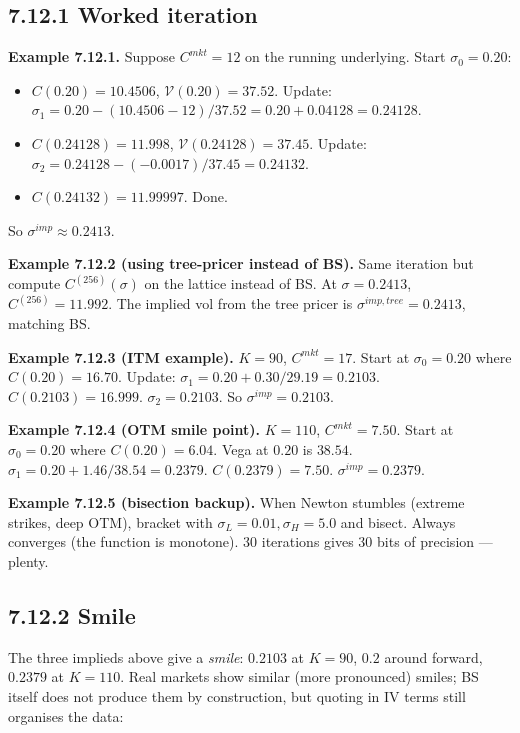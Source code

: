 \documentclass[
  10pt,
  twoside]{book}
\providecommand{\tightlist}{%
  \setlength{\itemsep}{0pt}\setlength{\parskip}{0pt}}
\begin{document}
\subsection{7.12.1 Worked iteration}\label{worked-iteration}

\textbf{Example 7.12.1.} Suppose \(C^{mkt} = 12\) on the running
underlying. Start \(\sigma_0 = 0.20\):

\begin{itemize}
\tightlist
\item
  \(C(0.20) = 10.4506\), \(\mathcal V(0.20) = 37.52\). Update:
  \(\sigma_1 = 0.20 - (10.4506 - 12)/37.52 = 0.20 + 0.04128 = 0.24128\).
\item
  \(C(0.24128) = 11.998\), \(\mathcal V(0.24128) = 37.45\). Update:
  \(\sigma_2 = 0.24128 - (-0.0017)/37.45 = 0.24132\).
\item
  \(C(0.24132) = 11.99997\). Done.
\end{itemize}

So \(\sigma^{imp} \approx 0.2413\).

\textbf{Example 7.12.2 (using tree-pricer instead of BS).} Same
iteration but compute \(C^{(256)}(\sigma)\) on the lattice instead of
BS. At \(\sigma = 0.2413\), \(C^{(256)} = 11.992\). The implied vol from
the tree pricer is \(\sigma^{imp,tree} = 0.2413\), matching BS.

\textbf{Example 7.12.3 (ITM example).} \(K = 90\), \(C^{mkt} = 17\).
Start at \(\sigma_0 = 0.20\) where \(C(0.20) = 16.70\). Update:
\(\sigma_1 = 0.20 + 0.30/29.19 = 0.2103\). \(C(0.2103) = 16.999\).
\(\sigma_2 = 0.2103\). So \(\sigma^{imp} = 0.2103\).

\textbf{Example 7.12.4 (OTM smile point).} \(K = 110\),
\(C^{mkt} = 7.50\). Start at \(\sigma_0 = 0.20\) where
\(C(0.20) = 6.04\). Vega at \(0.20\) is \(38.54\).
\(\sigma_1 = 0.20 + 1.46/38.54 = 0.2379\). \(C(0.2379) = 7.50\).
\(\sigma^{imp} = 0.2379\).

\textbf{Example 7.12.5 (bisection backup).} When Newton stumbles
(extreme strikes, deep OTM), bracket with
\(\sigma_L = 0.01, \sigma_H = 5.0\) and bisect. Always converges (the
function is monotone). 30 iterations gives 30 bits of precision ---
plenty.

\subsection{7.12.2 Smile}\label{smile}

The three implieds above give a \emph{smile}: \(0.2103\) at \(K = 90\),
\(0.2\) around forward, \(0.2379\) at \(K = 110\). Real markets show
similar (more pronounced) smiles; BS itself does not produce them by
construction, but quoting in IV terms still organises the data:
\end{document}
